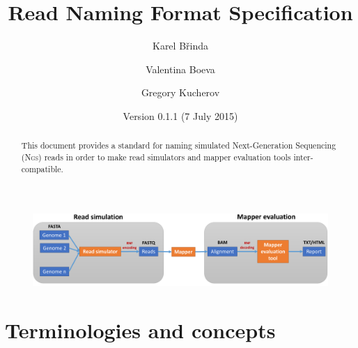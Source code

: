 \documentclass[10pt,a4paper]{article}
\title{Read Naming Format Specification}
\date{Version 0.1.1 (7 July 2015)}
\author{Karel Břinda \and Valentina Boeva \and Gregory Kucherov}
\newcommand{\RNF}{\textsc{Rnf}}
\newcommand{\NGS}{\textsc{Ngs}}
\begin{document}
\maketitle


\begin{abstract}
	This document provides a standard for
	naming simulated Next-Generation Sequencing (\NGS) reads
	in order to make read simulators and mapper evaluation tools inter-compatible.
\end{abstract}


\bigskip

\begin{figure}[h]
\includegraphics[width=\textwidth]{evaluation_rnf_cropped.pdf}
\end{figure}



\section{Terminologies and concepts}
\end{document}
